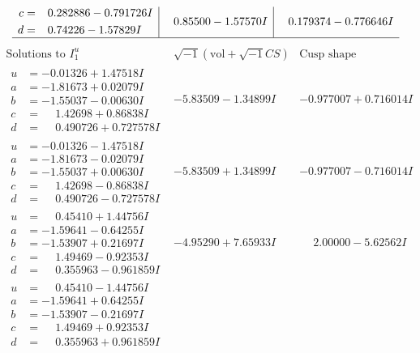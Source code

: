 \documentclass[1p]{elsarticle_modified}
\theoremstyle{definition}
\newcommand{\I}{\sqrt{-1}}
\begin{document}
$$\begin{array}{c|c|c}
\begin{aligned}
c &= \phantom{-}0.282886 - 0.791726 I \\
d &= \phantom{-}0.74226 - 1.57829 I\end{aligned}
 & \phantom{-}0.85500 - 1.57570 I & \phantom{-}0.179374 - 0.776646 I\\
 \hline 
 \end{array}$$\newpage$$\begin{array}{c|c|c}  
\text{Solutions to }I^u_{1}& \I (\text{vol} + \sqrt{-1}CS) & \text{Cusp shape}\\
 \hline 
\begin{aligned}
u &= -0.01326 + 1.47518 I \\
a &= -1.81673 + 0.02079 I \\
b &= -1.55037 - 0.00630 I \\
c &= \phantom{-}1.42698 + 0.86838 I \\
d &= \phantom{-}0.490726 + 0.727578 I\end{aligned}
 & -5.83509 - 1.34899 I & -0.977007 + 0.716014 I \\ \hline\begin{aligned}
u &= -0.01326 - 1.47518 I \\
a &= -1.81673 - 0.02079 I \\
b &= -1.55037 + 0.00630 I \\
c &= \phantom{-}1.42698 - 0.86838 I \\
d &= \phantom{-}0.490726 - 0.727578 I\end{aligned}
 & -5.83509 + 1.34899 I & -0.977007 - 0.716014 I \\ \hline\begin{aligned}
u &= \phantom{-}0.45410 + 1.44756 I \\
a &= -1.59641 - 0.64255 I \\
b &= -1.53907 + 0.21697 I \\
c &= \phantom{-}1.49469 - 0.92353 I \\
d &= \phantom{-}0.355963 - 0.961859 I\end{aligned}
 & -4.95290 + 7.65933 I & \phantom{-}2.00000 - 5.62562 I \\ \hline\begin{aligned}
u &= \phantom{-}0.45410 - 1.44756 I \\
a &= -1.59641 + 0.64255 I \\
b &= -1.53907 - 0.21697 I \\
c &= \phantom{-}1.49469 + 0.92353 I \\
d &= \phantom{-}0.355963 + 0.961859 I\end{aligned}

\end{array}$$
\end{document}
